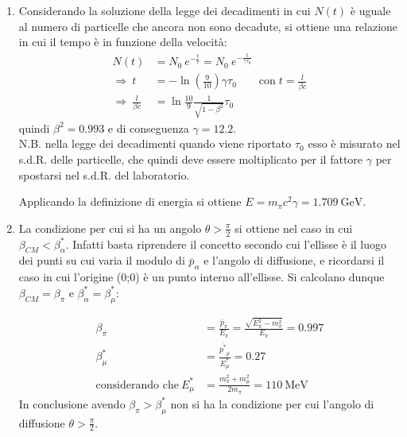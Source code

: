 \documentclass[12pt,twoside,a4]{article}
\begin{document}
\newpage
\begin{solution}
\vspace{-1cm}
	\begin{enumerate}[label=(\textit{\roman*})]
		\item Considerando la soluzione della legge dei decadimenti in cui $N(t)$ è uguale al numero di particelle che ancora non sono decadute, si ottiene una relazione in cui il tempo è in funzione della velocità:
		\begin{align*}
	    N(t) &= N_0 \ e^{-\frac{t}{\tau}} = N_0 \ e^{-\frac{t}{\gamma \tau_0}} \\
	    \Rightarrow  \  t &= -\ln{\left( \frac{9}{10}\right)} \gamma \tau_0 \qquad \text{con} \; t = \frac{l}{\beta c} \\
	    \Rightarrow  \  \frac{l}{\beta c } &= \ln{\frac{10}{9}} \frac{1}{\sqrt{1-\beta^2}} \tau_0 
	   	\end{align*}
	 quindi $\beta^2 = 0.993$ e di conseguenza $\gamma = 12.2$. \\
  N.B. nella legge dei decadimenti quando viene riportato $\tau_0$ esso è misurato nel s.d.R. delle particelle, che quindi deve essere moltiplicato per il fattore $\gamma$ per spostarsi nel s.d.R. del laboratorio.
	
	Applicando la definizione di energia si ottiene $E = m_\pi c^2 \gamma = 1.709 \ \mathrm{GeV}$.
	
	\item La condizione per cui si ha un angolo $\theta > \frac{\pi}{2}$ si ottiene nel caso in cui $\beta_{CM} < \beta^\ast_\alpha$. Infatti basta riprendere il concetto secondo cui l'ellisse è il luogo dei punti su cui varia il modulo di $\overline{p}_\alpha$ e l'angolo di diffusione, e ricordarsi il caso in cui l'origine (0;0) è un punto interno all'ellisse. Si calcolano dunque $\beta_{CM} = \beta_\pi$ e $\beta^\ast_\alpha = \beta^\ast_\mu$:
	
	\begin{align*}
	    \beta_\pi &= \frac{\overline{p}_\pi}{E_\pi} = \frac{\sqrt{E^2_\pi - m^2_\pi}}{E_\pi} = 0.997 \\
	    \beta^\ast_\mu &= \frac{\overline{p^\ast}_\mu}{E^\ast_\mu} = 0.27 \\
	    \text{considerando che}  \  E^\ast_\mu &= \frac{m^2_\pi + m^2_\mu}{2 m_\pi} = 110 \ \mathrm{MeV}
	\end{align*}	
	In conclusione avendo $\beta_\pi > \beta^\ast_\mu$ non si ha la condizione per cui l'angolo di diffusione $\theta > \frac{\pi}{2}$.
\end{enumerate}

\end{solution}
 
\end{document}
